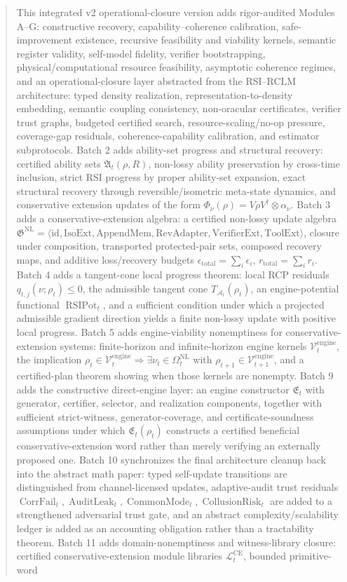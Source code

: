\documentclass[11pt]{article}
\newcommand{\Lcal}{\mathcal{L}}
\newcommand{\1}{\mathbf{1}}
\providecommand{\Vcal}{\mathcal{V}}
\providecommand{\CorrFail}{\operatorname{CorrFail}}
\providecommand{\AuditLeak}{\operatorname{AuditLeak}}
\providecommand{\CommonMode}{\operatorname{CommonMode}}
\providecommand{\CollusionRisk}{\operatorname{CollusionRisk}}
\begin{document}
\begin{abstract}
This integrated v2 operational-closure version adds rigor-audited Modules A--G: constructive recovery, capability--coherence calibration, safe-improvement existence, recursive feasibility and viability kernels, semantic register validity, self-model fidelity, verifier bootstrapping, physical/computational resource feasibility, asymptotic coherence regimes, and an operational-closure layer abstracted from the RSI--RCLM architecture: typed density realization, representation-to-density embedding, semantic coupling consistency, non-oracular certificates, verifier trust graphs, budgeted certified search, resource-scaling/no-op pressure, coverage-gap residuals, coherence-capability calibration, and estimator subprotocols. Batch 2 adds ability-set progress and structural recovery: certified ability sets \(\mathfrak A_t(\rho,R)\), non-lossy ability preservation by cross-time inclusion, strict RSI progress by proper ability-set expansion, exact structural recovery through reversible/isometric meta-state dynamics, and conservative extension updates of the form \(\Phi_\nu(\rho)=V\rho V^\dagger\otimes\alpha_\nu\). Batch 3 adds a conservative-extension algebra: a certified non-lossy update algebra \(\mathfrak G^{\mathrm{NL}}=\langle \mathrm{id},\mathrm{IsoExt},\mathrm{AppendMem},\mathrm{RevAdapter},\mathrm{VerifierExt},\mathrm{ToolExt}\rangle\), closure under composition, transported protected-pair sets, composed recovery maps, and additive loss/recovery budgets \(\epsilon_{\mathrm{total}}=\sum_i\epsilon_i\), \(r_{\mathrm{total}}=\sum_i r_i\). Batch 4 adds a tangent-cone local progress theorem: local RCP residuals \(q_{t,j}(\nu;\rho_t)\le0\), the admissible tangent cone \(T_{\mathcal A_t}(\rho_t)\), an engine-potential functional \(\operatorname{RSIPot}_t\), and a sufficient condition under which a projected admissible gradient direction yields a finite non-lossy update with positive local progress. Batch 5 adds engine-viability nonemptiness for conservative-extension systems: finite-horizon and infinite-horizon engine kernels \(\Vcal_t^{\mathrm{engine}}\), the implication \(\rho_t\in\Vcal_t^{\mathrm{engine}}\Rightarrow\exists\nu_t\in\Omega_t^{\mathrm{NL}}\) with \(\rho_{t+1}\in\Vcal_{t+1}^{\mathrm{engine}}\), and a certified-plan theorem showing when those kernels are nonempty. Batch 9 adds the constructive direct-engine layer: an engine constructor \(\mathfrak E_t\) with generator, certifier, selector, and realization components, together with sufficient strict-witness, generator-coverage, and certificate-soundness assumptions under which \(\mathfrak E_t(\rho_t)\) constructs a certified beneficial conservative-extension word rather than merely verifying an externally proposed one. Batch 10 synchronizes the final architecture cleanup back into the abstract math paper: typed self-update transitions are distinguished from channel-licensed updates, adaptive-audit trust residuals \(\CorrFail_t,\AuditLeak_t,\CommonMode_t,\CollusionRisk_t\) are added to a strengthened adversarial trust gate, and an abstract complexity/scalability ledger is added as an accounting obligation rather than a tractability theorem. Batch 11 adds domain-nonemptiness and witness-library closure: certified conservative-extension module libraries \(\Lcal_t^{\mathrm{CE}}\), bounded primitive-word 
\end{abstract}
\end{document}
